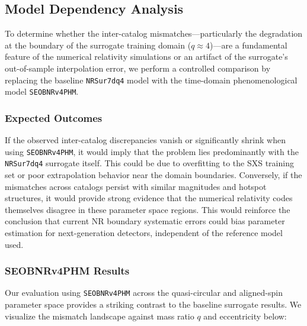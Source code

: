 \documentclass[%
 reprint,
superscriptaddress,
 amsmath,amssymb,
 aps,
]{revtex4-2}
\begin{document}
\subsection{Model Dependency Analysis}

To determine whether the inter-catalog mismatches—particularly the degradation at the boundary of the surrogate training domain ($q \approx 4$)—are a fundamental feature of the numerical relativity simulations or an artifact of the surrogate's out-of-sample interpolation error, we perform a controlled comparison by replacing the baseline \texttt{NRSur7dq4} model with the time-domain phenomenological model \texttt{SEOBNRv4PHM}.

\subsubsection{Expected Outcomes}

If the observed inter-catalog discrepancies vanish or significantly shrink when using \texttt{SEOBNRv4PHM}, it would imply that the problem lies predominantly with the \texttt{NRSur7dq4} surrogate itself. This could be due to overfitting to the SXS training set or poor extrapolation behavior near the domain boundaries. Conversely, if the mismatches across catalogs persist with similar magnitudes and hotspot structures, it would provide strong evidence that the numerical relativity codes themselves disagree in these parameter space regions. This would reinforce the conclusion that current NR boundary systematic errors could bias parameter estimation for next-generation detectors, independent of the reference model used.

\subsubsection{SEOBNRv4PHM Results}

Our evaluation using \texttt{SEOBNRv4PHM} across the quasi-circular and aligned-spin parameter space provides a striking contrast to the baseline surrogate results. We visualize the mismatch landscape against mass ratio $q$ and eccentricity below:
\end{document}
